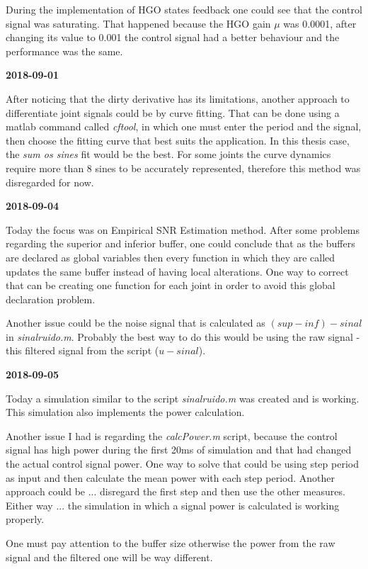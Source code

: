 During the implementation of HGO states feedback one could see that the control signal was saturating. That happened because the HGO gain $\mu$ was 0.0001, after changing its value to 0.001 the control signal had a better behaviour and the performance was the same.

\textbf{2018-09-01}

After noticing that the dirty derivative has its limitations, another approach to differentiate joint signals could be by curve fitting. That can be done using a matlab command called \textit{cftool}, in which one must enter the period and the signal, then choose the fitting curve that best suits the application. In this thesis case, the \textit{sum os sines} fit would be the best. For some joints the curve dynamics require more than 8 sines to be accurately represented, therefore this method was disregarded for now.

\textbf{2018-09-04}

Today the focus was on Empirical SNR Estimation method. After some problems regarding the superior and inferior buffer, one could conclude that as the buffers are declared as global variables then every function in which they are called updates the same buffer instead of having local alterations. One way to correct that can be creating one function for each joint in order to avoid this global declaration problem.

Another issue could be the noise signal that is calculated as $(sup - inf) - sinal$ in \textit{sinalruido.m}. Probably the best way to do this would be using the raw signal - this filtered signal from the script ($u - sinal$).

\textbf{2018-09-05}

Today a simulation similar to the script \textit{sinalruido.m} was created and is working. This simulation also implements the power calculation.

Another issue I had is regarding the \textit{calcPower.m} script, because the control signal has high power during the first 20ms of simulation and that had changed the actual control signal power. One way to solve that could be using step period as input and then calculate the mean power with each step period. Another approach could be ... disregard the first step and then use the other measures. Either way ... the simulation in which a signal power is calculated is working properly.

One must pay attention to the buffer size otherwise the power from the raw signal and the filtered one will be way different.

